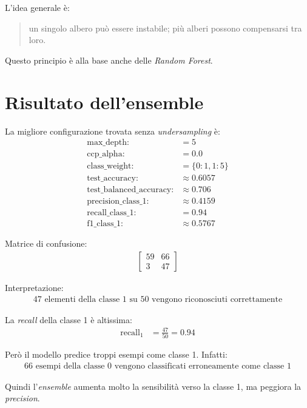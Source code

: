 \documentclass[11pt,a4paper]{article}
\begin{document}
L'idea generale è:
\begin{quote}
    un singolo albero può essere instabile; più alberi possono compensarsi tra loro.
\end{quote}

Questo principio è alla base anche delle \textit{Random Forest}.

\section{Risultato dell'ensemble}
La migliore configurazione trovata senza \textit{undersampling} è:
\begin{align*}
    \text{max\_depth:} &= 5 \\
    \text{ccp\_alpha:} &= 0.0 \\
    \text{class\_weight:} &= \{0: 1, 1: 5\} \\
    \text{test\_accuracy:} &\approx 0.6057 \\
    \text{test\_balanced\_accuracy:} &\approx 0.706 \\
    \text{precision\_class\_1:} &\approx 0.4159 \\
    \text{recall\_class\_1:} &= 0.94 \\
    \text{f1\_class\_1:} &\approx 0.5767
\end{align*}

Matrice di confusione:
\begin{align*}
    \begin{bmatrix}
        59 & 66 \\
        3 & 47
    \end{bmatrix}
\end{align*}

Interpretazione:
\begin{align*}
    47 \text{ elementi della classe 1 su 50 vengono riconosciuti correttamente}
\end{align*}

La \textit{recall} della classe 1 è altissima:
\begin{align*}
    \text{recall}_1 &= \frac{47}{50} = 0.94
\end{align*}

Però il modello predice troppi esempi come classe 1. Infatti:
\begin{align*}
    66 \text{ esempi della classe 0 vengono classificati erroneamente come classe 1}
\end{align*}

Quindi l'\textit{ensemble} aumenta molto la sensibilità verso la classe 1, ma peggiora la \textit{precision}.
\end{document}
